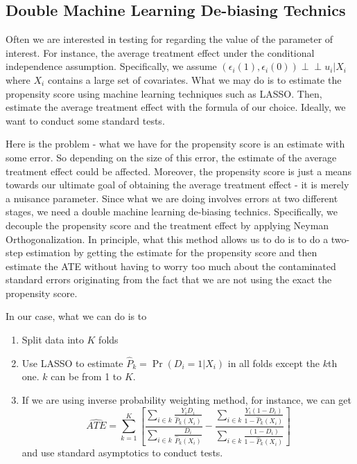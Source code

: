 \documentclass[12pt]{article}
\theoremstyle{definition}
\theoremstyle{property}
\theoremstyle{assumption}
\theoremstyle{example}
\theoremstyle{comment}
\begin{document}
\subsection{Double Machine Learning De-biasing Technics}
Often we are interested in testing for regarding the value of the parameter of interest. For instance, the average treatment effect under the conditional independence assumption. Specifically, we assume $(\epsilon_i(1),\epsilon_i(0))\perp\!\!\!\perp u_i|X_i$ where $X_i$ contains a large set of covariates. What we may do is to estimate the propensity score using machine learning techniques such as LASSO. Then, estimate the average treatment effect with the formula of our choice. Ideally, we want to conduct some standard tests. \par
Here is the problem - what we have for the propensity score is an estimate with some error. So depending on the size of this error, the estimate of the average treatment effect could be affected. Moreover, the propensity score is just a means towards our ultimate goal of obtaining the average treatment effect - it is merely a nuisance parameter. Since what we are doing involves errors at two different stages, we need a double machine learning de-biasing technics. Specifically, we decouple the propensity score and the treatment effect by applying Neyman Orthogonalization. In principle, what this method allows us to do is to do a two-step estimation by getting the estimate for the propensity score and then estimate the ATE without having to worry too much about the contaminated standard errors originating from the fact that we are not using the exact the propensity score. \par
In our case, what we can do is to
\begin{enumerate}
\item Split data into $K$ folds
\item Use LASSO to estimate $\hat{P}_k=\Pr(D_i=1|X_i)$ in all folds except the $k$th one. $k$ can be from 1 to $K$. 
\item If we are using inverse probability weighting method, for instance, we can get
\[
\widehat{ATE}=\sum_{k=1}^K\left[\frac{\sum_{i\in k}\frac{Y_iD_i}{\hat{P}_k(X_i)}}{\sum_{i\in k}\frac{D_i}{\hat{P}_k(X_i)}}-\frac{\sum_{i\in k}\frac{Y_i(1-D_i)}{1-\hat{P}_k(X_i)}}{\sum_{i\in k}\frac{(1-D_i)}{1-\hat{P}_k(X_i)}}\right]
\]
and use standard asymptotics to conduct tests. 
\end{enumerate}
\end{document}
